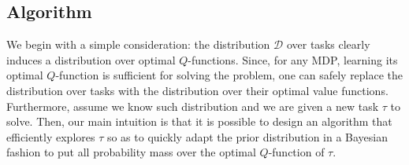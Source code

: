 \documentclass{article}
\begin{document}
\subsection{Algorithm}\label{sec:alg}

We begin with a simple consideration: the distribution $\mathcal{D}$ over tasks clearly induces a distribution over optimal $Q$-functions. Since, for any MDP, learning its optimal $Q$-function is sufficient for solving the problem, one can safely replace the distribution over tasks with the distribution over their optimal value functions. Furthermore, assume we know such distribution and we are given a new task $\tau$ to solve. Then, our main intuition is that it is possible to design an algorithm that efficiently explores $\tau$ so as to quickly adapt the prior distribution in a Bayesian fashion to put all probability mass over the optimal $Q$-function of $\tau$.
\end{document}
